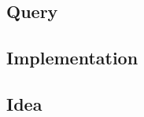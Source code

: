 \label {fs-optimization-example}

\subsection{Query}

\subsection{Implementation}

\subsection{Idea}